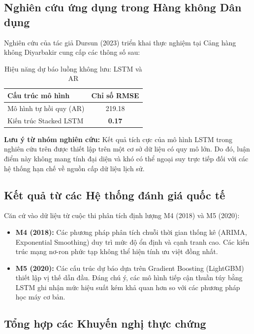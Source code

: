 \documentclass[12pt,a4paper]{article}
\begin{document}
\subsection{Nghiên cứu ứng dụng trong Hàng không Dân dụng}

Nghiên cứu của tác giả Dursun (2023) \cite{dursun2023air} triển khai thực nghiệm tại Cảng hàng không Diyarbakir cung cấp các thông số sau:

\begin{table}[htbp]
\centering
\caption{Hiệu năng dự báo luồng không lưu: LSTM và AR}
\label{tab:aviation_benchmark}
\begin{tabular}{|l|c|}
\hline
\textbf{Cấu trúc mô hình} & \textbf{Chỉ số RMSE} \\
\hline
Mô hình tự hồi quy (AR) & 219.18 \\
Kiến trúc Stacked LSTM & \textbf{0.17} \\
\hline
\end{tabular}
\end{table}

\textbf{Lưu ý từ nhóm nghiên cứu:} Kết quả tích cực của mô hình LSTM trong nghiên cứu trên được thiết lập trên một cơ sở dữ liệu có quy mô lớn. Do đó, luận điểm này không mang tính đại diện và khó có thể ngoại suy trực tiếp đối với các hệ thống hạn chế về nguồn cấp dữ liệu lịch sử.

\subsection{Kết quả từ các Hệ thống đánh giá quốc tế}

Căn cứ vào dữ liệu từ cuộc thi phân tích định lượng M4 (2018) và M5 (2020):
\begin{itemize}
    \item \textbf{M4 (2018):} Các phương pháp phân tích chuỗi thời gian thống kê (ARIMA, Exponential Smoothing) duy trì mức độ ổn định và cạnh tranh cao. Các kiến trúc mạng nơ-ron phức tạp không thể hiện tính ưu việt đồng nhất.
    \item \textbf{M5 (2020):} Các cấu trúc dự báo dựa trên Gradient Boosting (LightGBM) thiết lập vị thế dẫn đầu. Đáng chú ý, các mô hình tiếp cận thuần túy bằng LSTM ghi nhận mức hiệu suất kém khả quan hơn so với các phương pháp học máy cơ bản.
\end{itemize}

\subsection{Tổng hợp các Khuyến nghị thực chứng}
\end{document}
